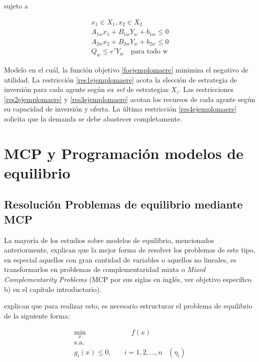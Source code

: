 sujeto a

\begin{align}
 x_{1} \in X_{1} ,x_{2} \in X_{2}\label{res1ejemplomaere}\\
A_{1w}x_{1}+B_{1w}Y_{w}+b_{1w} \le 0 \label{res2ejemplomaere}\\
A_{2w}x_{2}+B_{2w}Y_{w}+b_{2w} \le 0 \label{res3ejemplomaere}\\
Q_{w}\le e^{\tau}Y_{w}\text{  }\text{ para todo w}\label{res4ejemplomaere}
\end{align}

Modelo en el cuál, la función objetivo \ref{foejemplomaere} minimiza el negativo de utilidad. La restricción \ref{res1ejemplomaere} acota la elección de estrategia de inversión para cada agente según su \textit{set} de estrategias $X_i$. Las restricciones \ref{res2ejemplomaere} y \ref{res3ejemplomaere} acotan los recursos de cada agente según su capacidad de inversión y oferta. La última restricción \ref{res4ejemplomaere} solicita que la demanda se debe abastecer completamente.



\section{MCP y Programación modelos de equilibrio}

\subsection{Resolución Problemas de equilibrio mediante MCP}\label{descripcionkkt}

La mayoría de los estudios sobre modelos de equilibrio, mencionados anteriormente, explican que la mejor forma de resolver los problemas de este tipo, en especial aquellos con gran cantidad de variables o aquellos no lineales, es transformarlos en problemas de complementaridad mixta o \textit{Mixed Complementarity Problems} (MCP por sus siglas en inglés, ver objetivo específico b) en el capítulo introductorio).
\vspace{2.5mm}

 explican que para realizar esto, es necesario estructurar el problema de equilibrio de la siguiente forma:

\begin{align}
    \min_{x} & \quad f(x) \label{foej1}\\ 
    \textrm{s.a.} \nonumber\\
    g_{i}(x) \leq 0 ,\quad & i=1,2,...,n  &(\eta_{i}) \label{resej1} 
\end{align}

